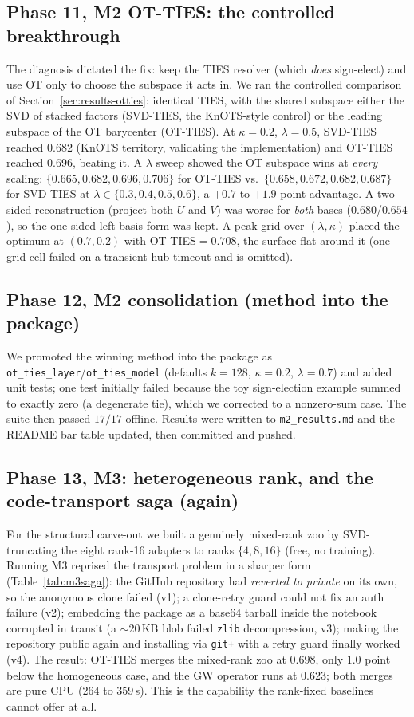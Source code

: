\documentclass[11pt]{article}
\newcommand{\otties}{\textsc{OT-TIES}}
\newcommand{\svdties}{\textsc{SVD-TIES}}
\begin{document}
\subsection{Phase 11, M2 OT-TIES: the controlled breakthrough}
\label{app:m2ties}
The diagnosis dictated the fix: keep the TIES resolver (which \emph{does} sign-elect) and use OT only to
choose the subspace it acts in. We ran the controlled comparison of Section~\ref{sec:results-otties}:
identical TIES, with the shared subspace either the SVD of stacked factors (\svdties{}, the KnOTS-style
control) or the leading subspace of the OT barycenter (\otties{}). At $\kappa=0.2$, $\lambda=0.5$,
\svdties{} reached $0.682$ (KnOTS territory, validating the implementation) and \otties{} reached $0.696$,
beating it. A $\lambda$ sweep showed the OT subspace wins at \emph{every} scaling: $\{0.665, 0.682,
0.696, 0.706\}$ for \otties{} vs.\ $\{0.658, 0.672, 0.682, 0.687\}$ for \svdties{} at
$\lambda\in\{0.3,0.4,0.5,0.6\}$, a $+0.7$ to $+1.9$ point advantage. A two-sided reconstruction (project
both $U$ and $V$) was worse for \emph{both} bases ($0.680$/$0.654$), so the one-sided left-basis form was
kept. A peak grid over $(\lambda,\kappa)$ placed the optimum at $(0.7, 0.2)$ with \otties{}$=0.708$, the
surface flat around it (one grid cell failed on a transient hub timeout and is omitted).

\subsection{Phase 12, M2 consolidation (method into the package)}
We promoted the winning method into the package as \texttt{ot\_ties\_layer}/\texttt{ot\_ties\_model}
(defaults $k{=}128$, $\kappa{=}0.2$, $\lambda{=}0.7$) and added unit tests; one test initially failed
because the toy sign-election example summed to exactly zero (a degenerate tie), which we corrected to a
nonzero-sum case. The suite then passed $17/17$ offline. Results were written to \texttt{m2\_results.md}
and the README bar table updated, then committed and pushed.

\subsection{Phase 13, M3: heterogeneous rank, and the code-transport saga (again)}
\label{app:m3saga}
For the structural carve-out we built a genuinely mixed-rank zoo by SVD-truncating the eight rank-16
adapters to ranks $\{4,8,16\}$ (free, no training). Running M3 reprised the transport problem in a sharper
form (Table~\ref{tab:m3saga}): the GitHub repository had \emph{reverted to private} on its own, so the
anonymous clone failed (v1); a clone-retry guard could not fix an auth failure (v2); embedding the package
as a base64 tarball inside the notebook corrupted in transit (a $\sim\!20$\,KB blob failed
\texttt{zlib} decompression, v3); making the repository public again and installing via \texttt{git+} with
a retry guard finally worked (v4). The result: \otties{} merges the mixed-rank zoo at $0.698$, only $1.0$
point below the homogeneous case, and the GW operator runs at $0.623$; both merges are pure CPU
($264$ to $359$\,s). This is the capability the rank-fixed baselines cannot offer at all.
\end{document}
